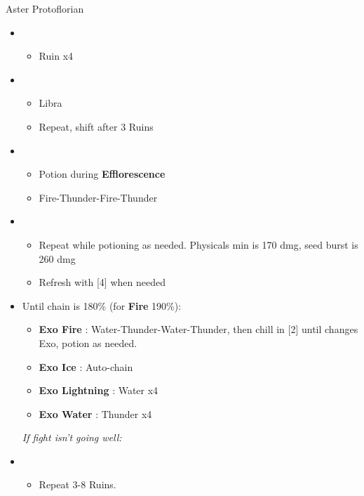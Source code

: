 \begin{battle}{Aster Protoflorian}
  \begin{multicols}{2}
    \begin{itemize}
      \item \first
            \begin{itemize}
              \item Ruin x4
            \end{itemize}
      \item \third
            \begin{itemize}
              \item Libra
              \item Repeat, shift after 3 Ruins
            \end{itemize}
      \item \fourth
            \begin{itemize}
              \item Potion during \textbf{Efflorescence}
              \item Fire-Thunder-Fire-Thunder
            \end{itemize}
      \item \fifth
            \begin{itemize}
              \item Repeat while potioning as needed. Physicals min is 170 dmg, seed burst is 260 dmg
              \item Refresh with [4] when needed
            \end{itemize}
      \item Until chain is 180\% (for \textbf{Fire} 190\%):
            \begin{itemize}
              \item \textbf{Exo Fire} : Water-Thunder-Water-Thunder, then chill in [2] until changes Exo, potion as needed.
              \item \textbf{Exo Ice} : Auto-chain
              \item \textbf{Exo Lightning} : Water x4
              \item \textbf{Exo Water} : Thunder x4
            \end{itemize}
            {\it If fight isn't going well:}
      \item \first
            \begin{itemize}
              \item Repeat 3-8 Ruins.
            \end{itemize}
            \columnbreak

\end{itemize}
\end{multicols}
\end{battle}
